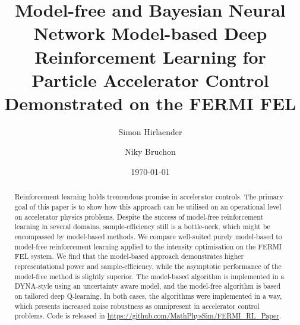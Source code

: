 \documentclass[
reprint,
amsmath,amssymb,amsfonts,clevref,
aps,
prstab,
]{revtex4-2}
\begin{document}
	
	
	
	
	\title{Model-free and Bayesian Neural Network Model-based Deep Reinforcement Learning for Particle Accelerator Control Demonstrated on the FERMI FEL}
	
	
	
	\author{Simon Hirlaender}
	
	\author{Niky Bruchon}
	\date{\today}%
	
	
	
	\begin{abstract}
		Reinforcement learning holds tremendous promise in accelerator controls. The primary goal of this paper is to show how this approach can be utilised on an operational level on accelerator physics problems. Despite the success of model-free reinforcement learning in several domains, sample-efficiency still is a bottle-neck, which might be encompassed by model-based methods.
		We compare well-suited purely model-based to model-free reinforcement learning applied to the intensity optimisation on the FERMI FEL system. We find that the model-based approach demonstrates higher representational power and sample-efficiency, while the asymptotic performance of the model-free method is slightly superior. The model-based algorithm is implemented in a DYNA-style using an uncertainty aware model, and the model-free algorithm is based on tailored deep Q-learning. In both cases, the algorithms were implemented in a way, which presents increased noise robustness as omnipresent in accelerator control problems. Code is released in \url{https://github.com/MathPhysSim/FERMI_RL_Paper}.
		
	\end{abstract}
	\maketitle
	
\end{document}
